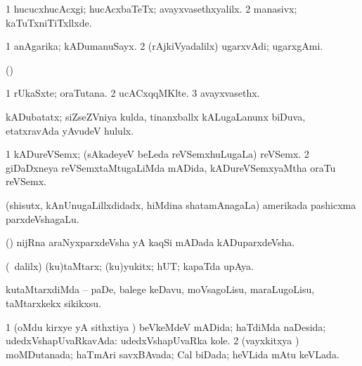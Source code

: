 {{{{{{\bentry
{}
  \gl{\nA}\bmng
{} 
\emng
\eentry

\bentry
{}
  \gl{\kirxvi}\bmng
\bnum
\num{1} hucucxhucAcxgi; hucAcxbaTeTx; avayxvasethxyalilx. 
\num{2} manasivx; kaTuTxniTiTxllxde. 
\enum
\emng
\eentry

\bentry
{}
 \gl{\nA}\bmng
\bnum
\num{1} anAgarika; kADumanuSayx. 
\num{2} (rAjkiVyadalilx) ugarxvAdi; ugarxgAmi. 
\enum
\emng

\noindent
\gl{\pagu}
\bmng
{} (\AmA)  
\emng
\eentry

\bentry
{}
  \gl{\nA}\bmng
\bnum
\num{1} rUkaSxte; oraTutana. 
\num{2} ucACxqqMKlte. 
\num{3} avayxvasethx. 
\enum
\emng
\eentry

\bentry
{}
 \gl{\nA}\bmng
kADubatatx; siZseZVniya kulda, tinanxballx kALugaLanunx biDuva, etatxravAda yAvudeV hululx. 
\emng
\eentry

\bentry
{}
 \gl{\nA}\bmng
\bnum
\num{1} kADureVSemx; (sAkadeyeV beLeda reVSemxhuLugaLa) reVSemx. 
\num{2} giDaDxneya reVSemxtaMtugaLiMda mADida, kADureVSemxyaMtha oraTu reVSemx. 
\enum
\emng
\eentry

\bentry
{}
 \gl{\nA}\bmng
(shisutx, kAnUnugaLillxdidadx, hiMdina shatamAnagaLa) amerikada pashicxma parxdeVshagaLu. 
\emng
\eentry

\bentry
{}
  \gl{\nA}\bmng
(\kAparx) nijRna araNyxparxdeVsha yA kaqSi mADada kADuparxdeVsha. 
\emng
\eentry

\bentry
{} 
\gl{\nA}
\expl{}
\bmng
(\sA\ \bava dalilx) (ku)taMtarx; (ku)yukitx; hUT; kapaTda upAya. 
\emng
\eentry

 \bentry
{}
\gl{\sakirx}
\bmng
kutaMtarxdiMda -- paDe, balege keDavu, moVsagoLisu, maraLugoLisu, taMtarxkekx sikikxsu. 
\emng
\eentry

\bentry
{}
  \gl{\gu}\bmng
\bnum
\num{1} (oMdu kirxye yA sithxtiya \vi) beVkeMdeV mADida; haTdiMda naDesida; udedxVshapUvaRkavAda:  udedxVshapUvaRka kole. 
\num{2} (vayxkitxya \vi) moMDutanada; haTmAri savxBAvada; Cal biDada; heVLida mAtu keVLada. 
\enum
\emng
\eentry

}}}}}}
